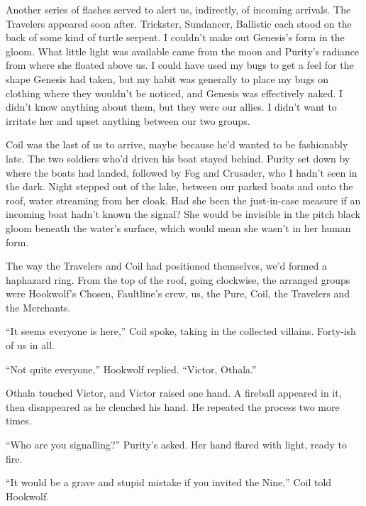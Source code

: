 Another series of flashes served to alert us, indirectly, of incoming arrivals.  The Travelers appeared soon after.  Trickster, Sundancer, Ballistic each stood on the back of some kind of turtle serpent.  I couldn't make out Genesis's form in the gloom.  What little light was available came from the moon and Purity's radiance from where she floated above us.  I could have used my bugs to get a feel for the shape Genesis had taken, but my habit was generally to place my bugs on clothing where they wouldn't be noticed, and Genesis was effectively naked.  I didn't know anything about them, but they were our allies.  I didn't want to irritate her and upset anything between our two groups.



Coil was the last of us to arrive, maybe because he'd wanted to be fashionably late.  The two soldiers who'd driven his boat stayed behind.  Purity set down by where the boats had landed, followed by Fog and Crusader, who I hadn't seen in the dark.  Night stepped out of the lake, between our parked boats and onto the roof, water streaming from her cloak.  Had she been the just-in-case measure if an incoming boat hadn't known the signal?  She would be invisible in the pitch black gloom beneath the water's surface, which would mean she wasn't in her human form.



The way the Travelers and Coil had positioned themselves, we'd formed a haphazard ring.  From the top of the roof, going clockwise, the arranged groups were Hookwolf's Chosen, Faultline's crew, us, the Pure, Coil, the Travelers and the Merchants.



``It seems everyone is here,'' Coil spoke, taking in the collected villains.  Forty-ish of us in all.



``Not quite everyone,'' Hookwolf replied.  ``Victor, Othala.''



Othala touched Victor, and Victor raised one hand.  A fireball appeared in it, then disappeared as he clenched his hand.  He repeated the process two more times.



``Who are you signalling?'' Purity's asked.  Her hand flared with light, ready to fire.



``It would be a grave and stupid mistake if you invited the Nine,'' Coil told Hookwolf.



